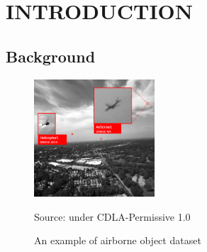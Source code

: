 \chapter{INTRODUCTION}
\section{Background}
\label{section:background}

    \begin{figure}[b!] 
        \centering
        \includegraphics[width=0.4\textwidth]{figures/dataset-example-labeled.png}
        \caption*{Source: \textcite{aot_dataset} under CDLA-Permissive 1.0}
        \vspace{-2ex}
        \caption{An example of airborne object dataset}
        \label{fig:airborne-object-example-1}
    \end{figure}
    \vspace{-2ex}


